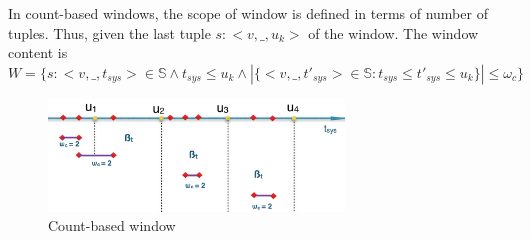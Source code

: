 In count-based windows, the scope of window is defined in terms of number of tuples. Thus, given the last tuple $s:<v, \_, u_k>$ of the window. The window content is 
$W=\{s:<v, \_, t_{sys}> \in \mathbb{S} \wedge t_{sys} \leq u_k \wedge  |\{<v,\_,t'_{sys}> \in \mathbb{S} : t_{sys} \leq t'_{sys} \leq u_k\}| \leq \omega_c \}$

\begin{figure}[htbp!] 
\centering    
\includegraphics[width=0.7\textwidth]{countbased_window}
\caption{Count-based window}
\label{fig:countbased_window}
\end{figure}



